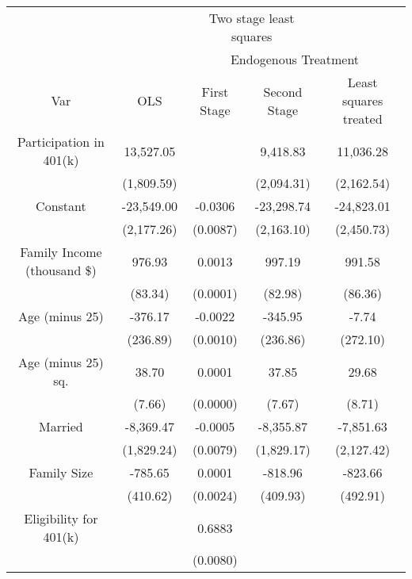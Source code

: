
\begin{tabular}{ccccc}
\toprule
\multicolumn{2}{c}{ } & \multicolumn{2}{c}{Two stage least squares} \\
\cmidrule(l{3pt}r{3pt}){3-4}
\multicolumn{2}{c}{ } & \multicolumn{3}{c}{Endogenous Treatment} \\
\cmidrule(l{3pt}r{3pt}){3-5}
Var & OLS & First Stage & Second Stage & Least squares treated\\
\midrule
Participation in 401(k) & 13,527.05 &  & 9,418.83 & 11,036.28\\
 & (1,809.59) &  & (2,094.31) & (2,162.54)\\
Constant & -23,549.00 & -0.0306 & -23,298.74 & -24,823.01\\
 & (2,177.26) & (0.0087) & (2,163.10) & (2,450.73)\\
Family Income (thousand \$) & 976.93 & 0.0013 & 997.19 & 991.58\\
 & (83.34) & (0.0001) & (82.98) & (86.36)\\
Age (minus 25) & -376.17 & -0.0022 & -345.95 & -7.74\\
 & (236.89) & (0.0010) & (236.86) & (272.10)\\
Age (minus 25) sq. & 38.70 & 0.0001 & 37.85 & 29.68\\
 & (7.66) & (0.0000) & (7.67) & (8.71)\\
Married & -8,369.47 & -0.0005 & -8,355.87 & -7,851.63\\
 & (1,829.24) & (0.0079) & (1,829.17) & (2,127.42)\\
Family Size & -785.65 & 0.0001 & -818.96 & -823.66\\
 & (410.62) & (0.0024) & (409.93) & (492.91)\\
Eligibility for 401(k) &  & 0.6883 &  & \\
 &  & (0.0080) &  & \\
\bottomrule
\end{tabular}
